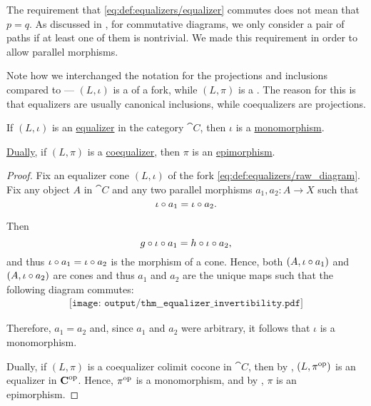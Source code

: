 \begin{definition}
  The requirement that \eqref{eq:def:equalizers/equalizer} commutes does not mean that \( p = q \). As discussed in , for commutative diagrams, we only consider a pair of paths if at least one of them is nontrivial. We made this requirement in order to allow parallel morphisms.

  Note how we interchanged the notation for the projections and inclusions compared to  --- \( (L, \iota) \) is a  of a fork, while \( (L, \pi) \) is a . The reason for this is that equalizers are usually canonical inclusions, while coequalizers are projections.
\end{definition}

\begin{proposition}\label{thm:equalizer_invertibility}
  If \( (L, \iota) \) is an \hyperref[def:equalizers]{equalizer} in the category \( \cat{C} \), then \( \iota \) is a \hyperref[def:morphism_invertibility/left_cancellative]{monomorphism}.

  \hyperref[thm:categorical_principle_of_duality]{Dually}, if \( (L, \pi) \) is a \hyperref[def:equalizers]{coequalizer}, then \( \pi \) is an \hyperref[def:morphism_invertibility/right_cancellative]{epimorphism}.
\end{proposition}
\begin{proof}
  Fix an equalizer cone \( (L, \iota) \) of the fork \eqref{eq:def:equalizers/raw_diagram}. Fix any object \( A \) in \( \cat{C} \) and any two parallel morphisms \( a_1, a_2: A \to X \) such that
  \begin{equation*}
    \iota \bincirc a_1 = \iota \bincirc a_2.
  \end{equation*}

  Then
  \begin{equation*}
    g \bincirc \iota \bincirc a_1 = h \bincirc \iota \bincirc a_2,
  \end{equation*}
  and thus \( \iota \bincirc a_1 = \iota \bincirc a_2 \) is the morphism of a cone. Hence, both \( (A, \iota \bincirc a_1) \) and \( (A, \iota \bincirc a_2) \) are cones and thus \( a_1 \) and \( a_2 \) are the unique maps such that the following diagram commutes:
  \begin{equation}\label{eq:thm:equalizer_invertibility/monomorphism}
    \begin{aligned}
      \texttt{[image: output/thm\_\_equalizer\_invertibility.pdf]}
    \end{aligned}
  \end{equation}

  Therefore, \( a_1 = a_2 \) and, since \( a_1 \) and \( a_2 \) were arbitrary, it follows that \( \iota \) is a monomorphism.

  Dually, if \( (L, \pi) \) is a coequalizer colimit cocone in \( \cat{C} \), then by , \( (L, \pi^{\operatorname{op}}) \) is an equalizer in \( \operatorname{\mathbf{C}}^{\operatorname{op}} \). Hence, \( \pi^{\operatorname{op}} \) is a monomorphism, and by , \( \pi \) is an epimorphism.
\end{proof}

